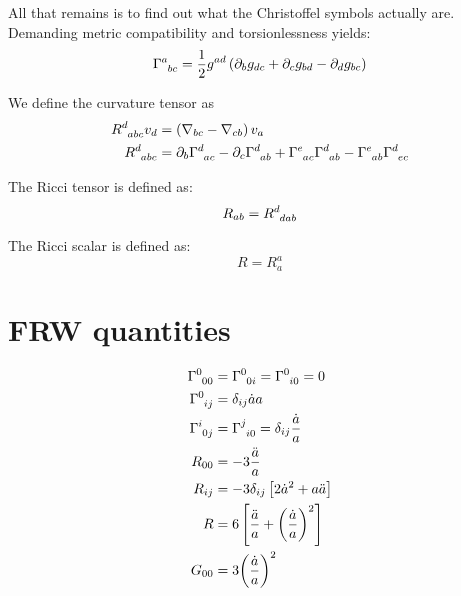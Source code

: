 All that remains is to find out what the Christoffel symbols actually are. Demanding metric compatibility and torsionlessness yields:
\begin{equation}
  \TG{a}{bc} = \frac{1}{2}g^{ad}
  \left( 
  \partial_b g_{dc} 
  +\partial_c g_{bd} 
  -\partial_d g_{bc} 
  \right)
  \label{eqn:dg:christoffel}
\end{equation}

We define the curvature tensor as
\begin{align}
  \tensor{R}{^d_{abc}} v_d &= \left( \nabla_{bc} - \nabla_{cb} \right) v_a
  \label{eqn:dg:riemann_def}\\
  \tensor{R}{^d_{abc}} &= \partial_b \TG{d}{ac} - \partial_c \TG{d}{ab} + \TG{e}{ac} \TG{d}{ab} - \TG{e}{ab} \TG{d}{ec}
\end{align}

The Ricci tensor is defined as:
\begin{equation}
  R_{ab} = \tensor{R}{^d_{dab}}
  \label{eqn:dg:ricci_tensor}
\end{equation}

The Ricci scalar is defined as:
\begin{equation}
  R = R^a_a
  \label{eqn:dg:ricci_scalar}
\end{equation}



\section{FRW quantities}
\begin{align}
  \TG{0}{00} &= \TG{0}{0i} = \TG{0}{i0} = 0 \\
  \TG{0}{ij} &= \delta_{ij} \dot{a}a \\
  \TG{i}{0j} &= \TG{j}{i0} = \delta_{ij} \frac{\dot{a}}{a} \\
  R_{00} &= -3 \frac{\ddot{a}}{a} \\
  R_{ij} &= -3 \delta_{ij}\left[ 2{\dot{a}}^2 + a \ddot{a} \right] \\
  R      &=  6 \left[ \frac{\ddot{a}}{a} + {\left( \frac{\dot{a}}{a} \right)}^2 \right] \\
  G_{00} &= 3 {\left( \frac{\dot{a}}{a} \right)}^2
\end{align}



